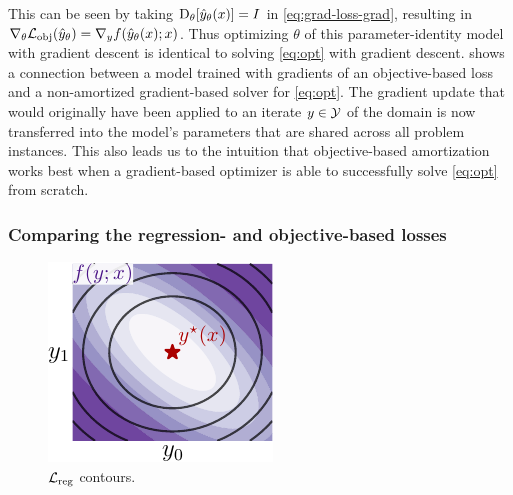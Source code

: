 \documentclass[twoside,11pt]{article}
\begin{document}
This can be seen by taking $\mathrm{D}_\theta[\hat y_\theta(x)]=I$
in \cref{eq:grad-loss-grad}, resulting in
$\nabla_\theta {\mathcal{L}}_{\rm obj}(\hat y_\theta)=\nabla_y f(\hat y_\theta(x); x)$.
Thus optimizing $\theta$ of this parameter-identity model with gradient descent
is identical to solving \cref{eq:opt} with gradient descent.
 shows a connection between a model trained with
gradients of an objective-based loss and a non-amortized gradient-based
solver for \cref{eq:opt}.
The gradient update that would originally have been applied to an
iterate $y\in{\mathcal{Y}}$ of the domain is now transferred into the
model's parameters that are shared across all problem instances.
This also leads us to the intuition that objective-based amortization
works best when a gradient-based optimizer is able to successfully
solve \cref{eq:opt} from scratch.

\subsubsection{Comparing the regression- and objective-based losses}
\begin{figure}
\includegraphics[width=\linewidth]{fig/loss-comp.pdf}\vspace{-3mm}
\caption{${\mathcal{L}}_{\rm reg}$ contours.}
\label{fig:reg-contours}
\end{figure}
\end{document}
